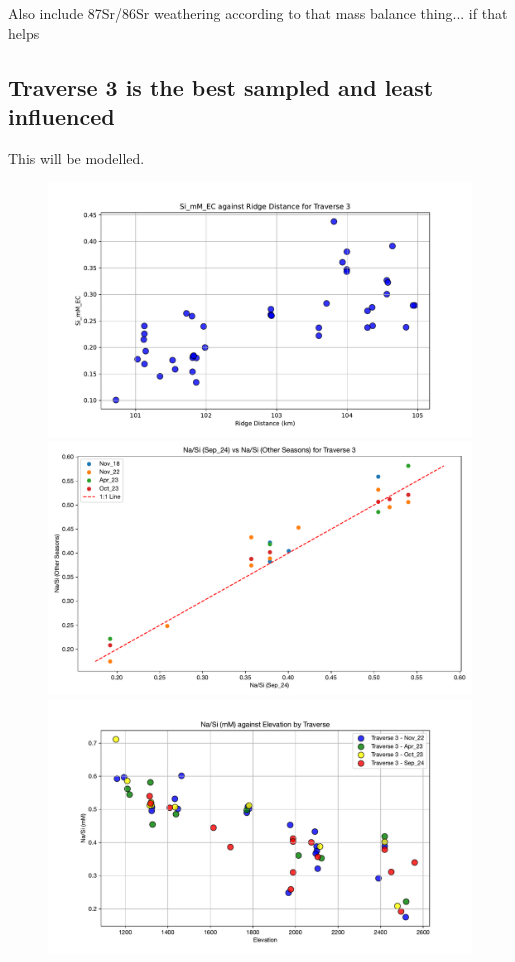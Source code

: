 \FloatBarrier


Also include 87Sr/86Sr weathering according to that mass balance thing... if that helps

\subsection{Traverse 3 is the best sampled and least influenced}
This will be modelled.

\begin{figure}[h]
    \centering
    \includegraphics[width=\textwidth]{Si_mM_EC_Ridge_Distance.pdf}
    \includegraphics[width=\textwidth]{Na_Si_Trav3.pdf}
    \includegraphics[width=\textwidth]{Na_Si_Elevation.pdf}

\end{figure}
